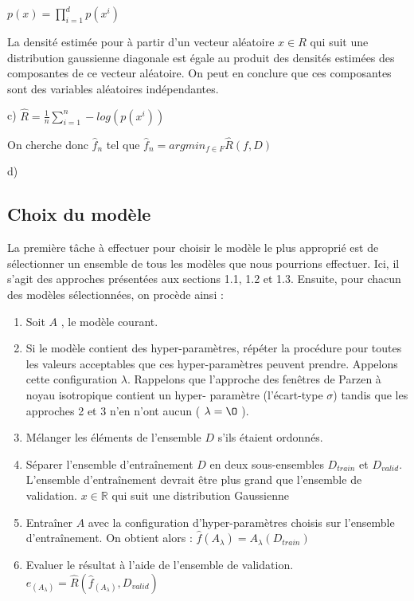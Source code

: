 \documentclass[a4paper,10pt]{article}
\begin{document}
$p(x) = \prod_{i=1}^{d} p(x^{i}) $


La densité estimée pour à partir d'un vecteur aléatoire $x \in R$ qui suit une distribution gaussienne diagonale est égale au produit des densités estimées des composantes de ce vecteur aléatoire. On peut en conclure que ces composantes sont des variables aléatoires indépendantes.


c) $\widehat{R} = \frac{1}{n} \sum_{i=1}^{n} -log (p(x^{i}))$

On cherche donc $\widehat{f}_{n}$ tel que $\widehat{f}_{n} = argmin_{f \in F} \widehat{R}(f,D)$

d) 


\subsection{Choix du modèle}

La première tâche à effectuer pour choisir le modèle le plus approprié est de sélectionner un ensemble de tous les modèles que nous pourrions effectuer. Ici, il s'agit des approches présentées aux sections 1.1, 1.2 et 1.3. Ensuite, pour chacun des modèles sélectionnées, on procède ainsi :

\begin{enumerate}
	\item Soit $A$ , le modèle courant.
	\item Si le modèle contient des hyper-paramètres, répéter la procédure pour toutes les valeurs acceptables que ces hyper-paramètres peuvent prendre. Appelons cette configuration $\lambda$. Rappelons que l'approche des fenêtres de Parzen à noyau isotropique contient un hyper- paramètre (l'écart-type $\sigma$) tandis que les approches 2 et 3 n'en n'ont aucun ( $\lambda= \O$ ).
	\item Mélanger les éléments de l'ensemble $D$ s'ils étaient ordonnés.
	\item Séparer l'ensemble d'entraînement $D$ en deux sous-ensembles $D_{train}$ et $D_{valid}$. L'ensemble d’entraînement devrait être plus grand que l'ensemble de validation. $x \in \mathds{R}$ qui suit une distribution Gaussienne
	\item Entraîner $A$ avec la configuration d'hyper-paramètres choisis sur l'ensemble d'entraînement. On obtient alors : $\widehat{f} (A_{\lambda})=A_{\lambda}(D_{train})$
	\item Evaluer le résultat à l'aide de l'ensemble de validation. $e_{(A_{\lambda})} = \widehat{R} ( \widehat{f}_{(A_{\lambda})} , D_{valid} )$
\end{enumerate}
\end{document}
